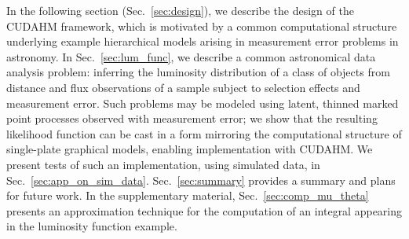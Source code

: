 
In the following section (Sec.~\ref{sec:design}), we describe the design of the CUDAHM framework, which is motivated by a common computational structure underlying example hierarchical models arising in measurement error problems in astronomy. 
In Sec.~\ref{sec:lum_func}, we describe a common astronomical data analysis problem: inferring the luminosity distribution of a class of objects from distance and flux observations of a sample subject to selection effects and measurement error.
Such problems may be modeled using latent, thinned marked point processes observed with measurement error; we show that the resulting likelihood function can be cast in a form mirroring the computational structure of single-plate graphical models, enabling implementation with CUDAHM.
We present tests of such an implementation, using simulated data, in Sec.~\ref{sec:app_on_sim_data}.
Sec.~\ref{sec:summary} provides a summary and plans for future work.
In the supplementary material, Sec.~\ref{sec:comp_mu_theta} presents an approximation technique for the computation of an integral appearing in the luminosity function example.
